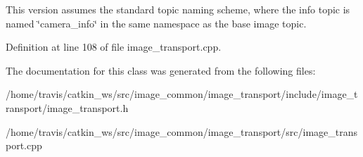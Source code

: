 This version assumes the standard topic naming scheme, where the info topic is named \char`\"{}camera\-\_\-info\char`\"{} in the same namespace as the base image topic. 

Definition at line 108 of file image\-\_\-transport.\-cpp.



The documentation for this class was generated from the following files\-:\begin{DoxyCompactItemize}
\item 
/home/travis/catkin\-\_\-ws/src/image\-\_\-common/image\-\_\-transport/include/image\-\_\-transport/image\-\_\-transport.\-h\item 
/home/travis/catkin\-\_\-ws/src/image\-\_\-common/image\-\_\-transport/src/image\-\_\-transport.\-cpp\end{DoxyCompactItemize}
